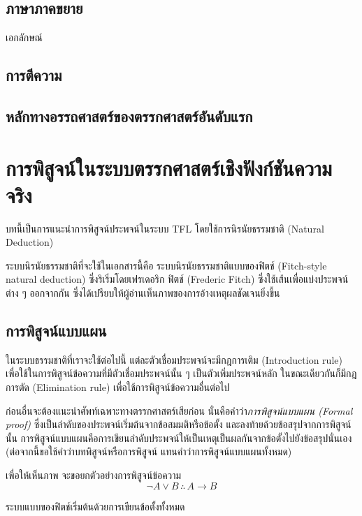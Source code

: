 \documentclass[a4paper,12pt]{extbook}
\theoremstyle{definition}
\theoremstyle{remark}
\begin{document}
		\section{ภาษาภาคขยาย} เอกลักษณ์
		\section{การตีความ}
		\section{หลักทางอรรถศาสตร์ของตรรกศาสตร์อันดับแรก}
	\chapter{การพิสูจน์ในระบบตรรกศาสตร์เชิงฟังก์ชันความจริง}
	บทนี้เป็นการแนะนำการพิสูจน์ประพจน์ในระบบ TFL โดยใช้การนิรนัยธรรมชาติ (Natural Deduction) 
	
	
	ระบบนิรนัยธรรมชาติที่จะใช้ในเอกสารนี้คือ ระบบนิรนัยธรรมชาติแบบของฟิตช์ (Fitch-style natural deduction) ซึ่งริเริ่มโดยเฟรเดอริก ฟิตช์ (Frederic Fitch) ซึ่งใช้เส้นเพื่อแบ่งประพจน์ต่าง ๆ ออกจากกัน ซึ่งได้เปรียบให้ผู้อ่านเห็นภาพของการอ้างเหตุผลชัดเจนยิ่งขึ้น
	
	\section{การพิสูจน์แบบแผน}
	ในระบบธรรมชาติที่เราจะใช้ต่อไปนี้ แต่ละตัวเชื่อมประพจน์จะมีกฎการเติม (Introduction rule) เพื่อใช้ในการพิสูจน์ข้อความที่มีตัวเชื่อมประพจน์นั้น ๆ เป็นตัวเพิ่มประพจน์หลัก ในขณะเดียวกันก็มีกฎการตัด (Elimination rule) เพื่อใช้การพิสูจน์ข้อความอื่นต่อไป
	
	ก่อนอื่นจะต้องแนะนำศัพท์เฉพาะทางตรรกศาสตร์เสียก่อน นั่นคือคำว่า\textit{การพิสูจน์แบบแผน (Formal proof)} ซึ่งเป็นลำดับของประพจน์เริ่มต้นจากข้อสมมติหรือข้อตั้ง และลงท้ายด้วยข้อสรุปจากการพิสูจน์นั้น การพิสูจน์แบบแผนคือการเขียนลำดับประพจน์ให้เป็นเหตุเป็นผลกันจากข้อตั้งไปยังข้อสรุปนั่นเอง (ต่อจากนี้ขอใช้คำว่าบทพิสูจน์หรือการพิสูจน์ แทนคำว่าการพิสูจน์แบบแผนทั้งหมด)
	
	เพื่อให้เห็นภาพ จะขอยกตัวอย่างการพิสูจน์ข้อความ
	\begin{equation*}
		\neg A \vee B \,\therefore\, A \to B
	\end{equation*}
	
	ระบบแบบของฟิตช์เริ่มต้นด้วยการเขียนข้อตั้งทั้งหมด
\end{document}
